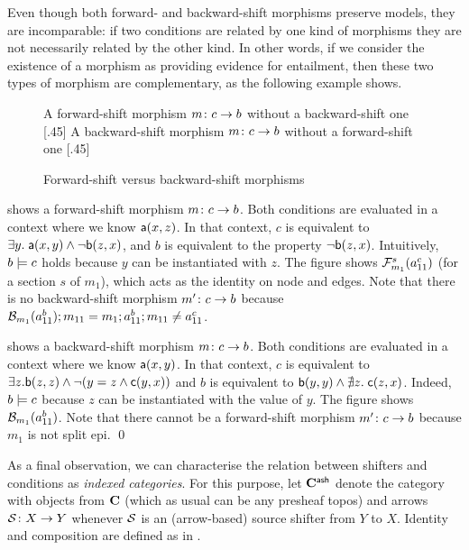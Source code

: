\medskip\noindent
Even though both forward- and backward-shift morphisms preserve models, they are incomparable: if two conditions are related by one kind of morphisms they are not necessarily related by the other kind. In other words, if we consider the existence of a morphism as providing evidence for entailment, then these two types of morphism are complementary, as the following example shows.
%
\begin{figure}[t]
\centering
\subcaptionbox
  {A forward-shift morphism $m \colon c \rightarrow b$ without a backward-shift one
  }
  [.45\textwidth]
  {}
  \qquad
\subcaptionbox
  {A backward-shift morphism $m \colon c \rightarrow b$ without a forward-shift one
  }
  [.45\textwidth]
  {}
\caption{Forward-shift versus backward-shift morphisms}
\end{figure}
%
\begin{example}
 shows a forward-shift morphism $m \colon c \rightarrow b$. 
Both conditions are evaluated in a context where we know $\mathsf{a}(x,z)$. In that context,  $c$ is equivalent to $\exists y.\; \mathsf{a}(x,y) \wedge \neg \mathsf{b}(z,x)$, and $b$ is equivalent to the property $\neg \mathsf{b}(z,x)$. Intuitively, $b\models c$ holds because $y$ can be instantiated with $z$. The figure shows $\mathcal{F}_{m_1}^s(a^c_{11})$ (for a section $s$ of $m_1$), which acts as the identity on node and edges. Note that there is no backward-shift morphism $m'\colon c \rightarrow b$ because $\mathcal{B}_{m_1}(a^b_{11}) ; m_{11} = m_1; a^b_{11} ; m_{11} \not = a^c_{11}$.

 shows a backward-shift morphism $m \colon c \rightarrow b$. 
Both conditions are evaluated in a context where we know $\mathsf{a}(x,y)$. In that context, $c$ is equivalent to $\exists z.\mathsf{b}(z,z) \wedge \neg(y=z \wedge \mathsf{c}(y,x))$ and $b$ is equivalent to $\mathsf{b}(y,y) \wedge \nexists z.\; \mathsf{c}(z,x)$.
Indeed, $b\models c$ because $z$ can be instantiated with the value of $y$. The figure shows $\mathcal{B}_{m_1}(a^b_{11})$. Note that there cannot be a forward-shift morphism $m'\colon c \rightarrow b$ because $m_1$ is not split epi.
\qed
\end{example}
%
As a final observation, we can characterise the relation between shifters and conditions as \emph{indexed categories}. For this purpose, let $\mathbf{C}^{\mathsf{ash}}$ denote the category with objects from $\mathbf{C}$ (which as usual can be any presheaf topos) and arrows $\mathcal{S}\colon X\rightarrow Y$ whenever $\mathcal{S}$ is an (arrow-based) source shifter from $Y$ to $X$. Identity and composition are defined as in .

